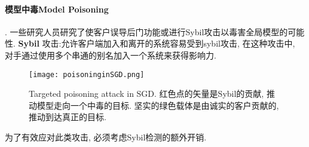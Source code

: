\paragraph{模型中毒Model Poisoning}. 一些研究人员研究了使客户误导后门功能或进行Sybil攻击以毒害全局模型的可能性. 
 \textbf{Sybil} 攻击:允许客户端加入和离开的系统容易受到sybil攻击, 在这种攻击中, 对手通过使用多个串通的别名加入一个系统来获得影响力. 
\begin{figure}[t]
    \centering    
    \texttt{[image: poisoninginSGD.png]}
    \caption{Targeted poisoning attack in SGD. 红色点的矢量是Sybil的贡献, 推动模型走向一个中毒的目标. 坚实的绿色载体是由诚实的客户贡献的, 推动到达真正的目标.     }
\end{figure}
为了有效应对此类攻击, 必须考虑Sybil检测的额外开销. 